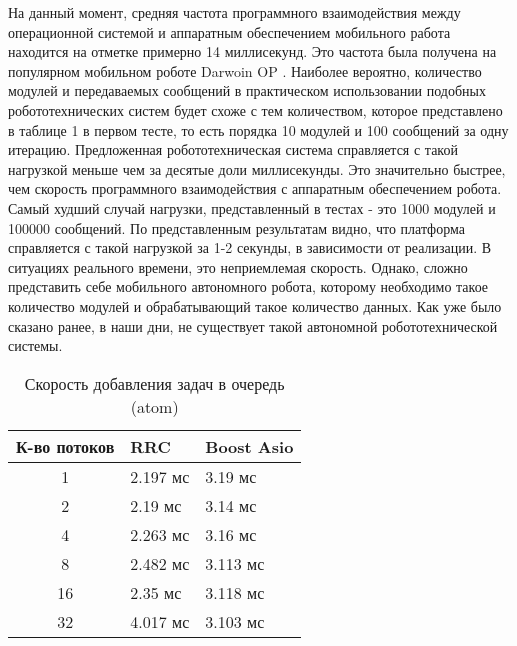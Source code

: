 На данный момент, средняя частота программного взаимодействия 
между операционной системой и аппаратным обеспечением мобильного 
работа находится на отметке примерно 14 миллисекунд. Это частота 
была получена на популярном мобильном роботе Darwoin OP 
\cite{ha2011development}. Наиболее вероятно, количество модулей 
и передаваемых сообщений в практическом использовании подобных 
робототехнических систем будет схоже с тем количеством, которое 
представлено в таблице 1 в первом тесте, то есть порядка 10 
модулей и 100 сообщений за одну итерацию. Предложенная 
робототехническая система справляется с такой нагрузкой меньше 
чем за десятые доли миллисекунды. Это значительно быстрее, чем 
скорость программного взаимодействия с аппаратным обеспечением 
робота. Самый худший случай нагрузки, представленный в тестах - 
это 1000 модулей и 100000 сообщений. По представленным 
результатам видно, что платформа справляется с такой нагрузкой 
за 1-2 секунды, в зависимости от реализации. В ситуациях 
реального времени, это неприемлемая скорость. Однако, сложно 
представить себе мобильного автономного робота, которому 
необходимо такое количество модулей и обрабатывающий такое 
количество данных. Как уже было сказано ранее, в наши дни, не 
существует такой автономной робототехнической системы.

\begin{table}[!htbp]
    \caption{\label{tab:atom_asio}Скорость добавления задач в 
    очередь (atom)}
    \begin{center}
        \begin{tabularx}{\linewidth}{|c|X|X|}
            \hline
            К-во потоков & RRC & Boost Asio  \\
            \hline
            1 & 2.197 мс & 3.19 мс \\
            \hline
            2 & 2.19 мс & 3.14 мс \\
            \hline
            4 & 2.263 мс & 3.16 мс \\
            \hline
            8 & 2.482 мс & 3.113 мс \\
            \hline
            16 & 2.35 мс & 3.118 мс \\
            \hline
            32 & 4.017 мс & 3.103 мс \\
            \hline
        \end{tabularx}
    \end{center}
\end{table}


